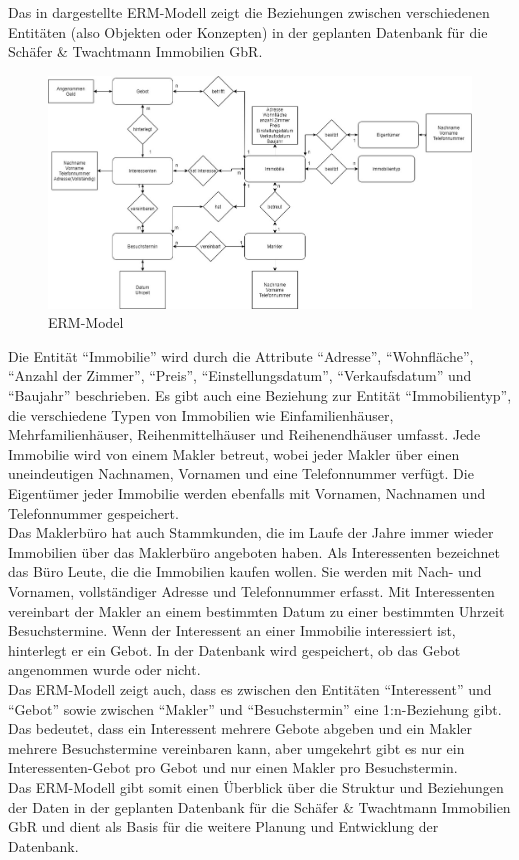 Das in  dargestellte ERM-Modell zeigt die Beziehungen zwischen verschiedenen Entitäten (also Objekten oder Konzepten) in der geplanten Datenbank für die Schäfer \& Twachtmann Immobilien GbR.

\begin{figure}[H]
    \includegraphics[width=\textwidth]{images/Immobilien_ERD}
    \caption{ERM-Model}
    \label{fig:erm}
\end{figure}

Die Entität ``Immobilie'' wird durch die Attribute ``Adresse'', ``Wohnfläche'', ``Anzahl der Zimmer'', ``Preis'', ``Einstellungsdatum'', ``Verkaufsdatum'' und ``Baujahr'' beschrieben.
Es gibt auch eine Beziehung zur Entität ``Immobilientyp'', die verschiedene Typen von Immobilien wie Einfamilienhäuser, Mehrfamilienhäuser, Reihenmittelhäuser und Reihenendhäuser umfasst.
Jede Immobilie wird von einem Makler betreut, wobei jeder Makler über einen uneindeutigen Nachnamen, Vornamen und eine Telefonnummer verfügt.
Die Eigentümer jeder Immobilie werden ebenfalls mit Vornamen, Nachnamen und Telefonnummer gespeichert.\\

Das Maklerbüro hat auch Stammkunden, die im Laufe der Jahre immer wieder Immobilien über das Maklerbüro angeboten haben.
Als Interessenten bezeichnet das Büro Leute, die die Immobilien kaufen wollen.
Sie werden mit Nach- und Vornamen, vollständiger Adresse und Telefonnummer erfasst.
Mit Interessenten vereinbart der Makler an einem bestimmten Datum zu einer bestimmten Uhrzeit Besuchstermine.
Wenn der Interessent an einer Immobilie interessiert ist, hinterlegt er ein Gebot.
In der Datenbank wird gespeichert, ob das Gebot angenommen wurde oder nicht.\\

Das ERM-Modell zeigt auch, dass es zwischen den Entitäten ``Interessent'' und ``Gebot'' sowie zwischen ``Makler'' und ``Besuchstermin'' eine 1:n-Beziehung gibt.
Das bedeutet, dass ein Interessent mehrere Gebote abgeben und ein Makler mehrere Besuchstermine vereinbaren kann, aber umgekehrt gibt es nur ein Interessenten-Gebot pro Gebot und nur einen Makler pro Besuchstermin.\\

Das ERM-Modell gibt somit einen Überblick über die Struktur und Beziehungen der Daten in der geplanten Datenbank für die Schäfer \& Twachtmann Immobilien GbR und dient als Basis für die weitere Planung und Entwicklung der Datenbank.
